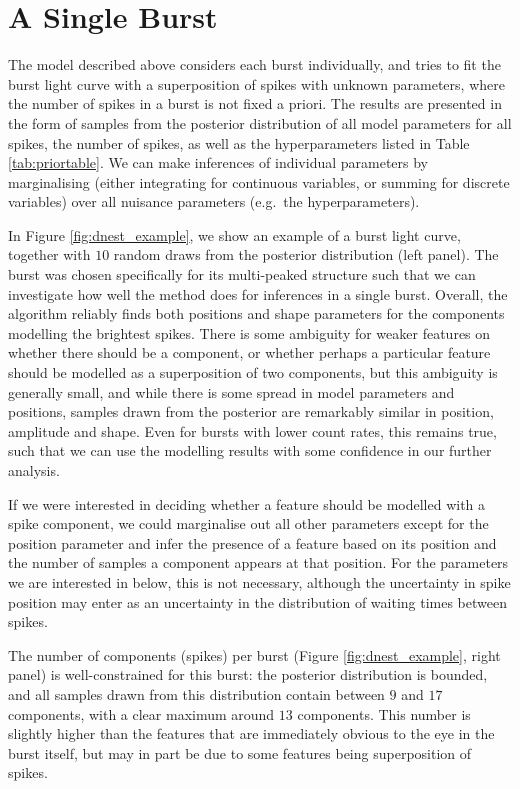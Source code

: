 \documentclass[12pt]{emulateapj}
\begin{document}
\section{A Single Burst}
\label{ch6:oneburst}

The model described above considers each burst individually, and tries to fit the burst light curve with a superposition of spikes with unknown parameters, where the number of
spikes in a burst is not fixed a priori. The results are presented in the form of samples from the posterior distribution of all model parameters for all spikes, the number of spikes,
as well as the hyperparameters listed in Table \ref{tab:priortable}. We can make inferences of individual parameters by marginalising (either integrating for continuous variables, or summing for
discrete variables) over all nuisance parameters (e.g.\ the hyperparameters). 

In Figure \ref{fig:dnest_example}, we show an example of a burst light curve, together with $10$ random draws from the posterior distribution (left panel).
The burst was chosen specifically for its multi-peaked structure such that we can investigate how well the method does for
inferences in a single burst. Overall, the algorithm reliably finds both positions and shape parameters for the components modelling
the brightest spikes. There is some ambiguity for weaker features on whether there should be a component, or whether perhaps a
particular feature should be modelled as a superposition of two components, but this ambiguity is generally small, and while there is some
spread in model parameters and positions, samples drawn from the posterior are remarkably similar in position, amplitude and shape. 
Even for bursts with lower count rates, this remains true, such that we can use the modelling results with some confidence in our further analysis.

If we were interested in deciding whether a feature should be modelled with a spike component, we could marginalise out all other parameters
except for the position parameter and infer the presence of a feature based on its position and the number of samples a component appears at
that position. For the parameters we are interested in below, this is not necessary, although the uncertainty in spike position may enter as an 
uncertainty in the distribution of waiting times between spikes.

The number of components (spikes) per burst (Figure \ref{fig:dnest_example}, right panel) is well-constrained for this burst: the posterior distribution is bounded, and all samples drawn
from this distribution contain between $9$ and $17$ components, with a 
clear maximum around $13$ components. This number is slightly higher than the features that are immediately obvious to the eye 
in the burst itself, but may in part be due to some features being superposition of spikes. 
\end{document}
